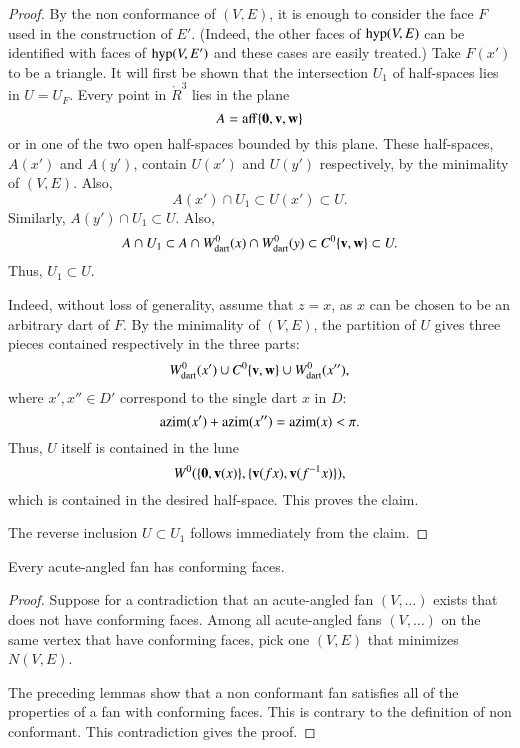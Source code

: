 \begin{proof}
By the non conformance of $(V,E)$, it is enough to consider
the face $F$ used in the construction of $E'$.  (Indeed, the other faces of ${\operatorname{hyp}}(V,E)$ can be identified with faces of ${\operatorname{hyp}}(V,E')$ and these cases are easily treated.) Take $F(x')$ to be a triangle.
It will first be shown that the intersection $U_1$ of half-spaces lies in $U=U_F$.
Every point in $\ring{R}^3$ lies in the plane
$$
A={\operatorname{aff}}\{{\mathbf 0},{\mathbf v},{\mathbf w}\}
$$
or in one of the two open half-spaces bounded by this plane.  These half-spaces, $A(x')$ and $A(y')$, 
contain $U(x')$ and $U(y')$ respectively, by the minimality of $(V,E)$.  Also,
$$
A(x')\cap U_1 \subset U(x')\subset U.
$$
Similarly, $A(y')\cap U_1 \subset U$.  Also,
$$
A \cap U_1 \subset A \cap W^0_{\text{dart}}(x) \cap W^0_{\text{dart}}(y) \subset C^0\{{\mathbf v},{\mathbf w}\} \subset U.
$$
Thus,
$U_1\subset U$.

 Indeed, without loss of generality, assume that $z=x$, 
as $x$ can be chosen to be an
arbitrary dart of $F$.  By the minimality of $(V,E)$,  
the partition  of $U$ gives three pieces
contained respectively in the three parts:
$$
W^0_{\text{dart}}(x') \cup C^0\{{\mathbf v},{\mathbf w}\} \cup W^0_{\text{dart}}(x''),
$$
where $x',x''\in D'$ correspond to the single dart $x$ in $D$:
$$
{\operatorname{azim}}(x') + {\operatorname{azim}}(x'') = {\operatorname{azim}}(x) < \pi.
$$
Thus, $U$ itself is contained in the lune
$$
W^0(\{{\mathbf 0},{\mathbf v}(x)\},\{{\mathbf v}(f x),{\mathbf v}(f^{-1} x)\}),
$$
which is contained in the desired half-space.  This proves the claim.

The reverse inclusion $U\subset U_1$ follows immediately from the claim.
\end{proof}

%


\begin{lemma}\label{lemma:face}
Every acute-angled fan has conforming faces.
\end{lemma}

\begin{proof}
Suppose for a contradiction that an acute-angled fan $(V,\ldots)$ exists that does not
have conforming faces.  Among all acute-angled fans $(V,\ldots)$ on the same vertex 
that have conforming faces, pick one $(V,E)$ that minimizes $N(V,E)$.

The preceding lemmas show that a non conformant fan satisfies all of the properties of a fan with conforming faces.  This is contrary to the definition of non conformant.  This contradiction gives the proof.
\end{proof}



